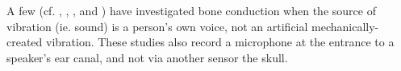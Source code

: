 \DIFaddend %
% 
%
A few (cf. \cite{bekesy:48}, \cite{hansen:97b}, \cite{porschmann:00}, and \cite{reinfeldt:10}) have investigated bone conduction when the source of vibration (ie. sound) is a person's own voice, not an artificial mechanically-created vibration.  These studies also record \DIFdelbegin {}\DIFdelend \DIFaddbegin {}\DIFaddend a microphone at the entrance to a speaker's ear canal, and not via another sensor \DIFdelbegin {}\DIFdelend \DIFaddbegin {}\DIFaddend the skull.

